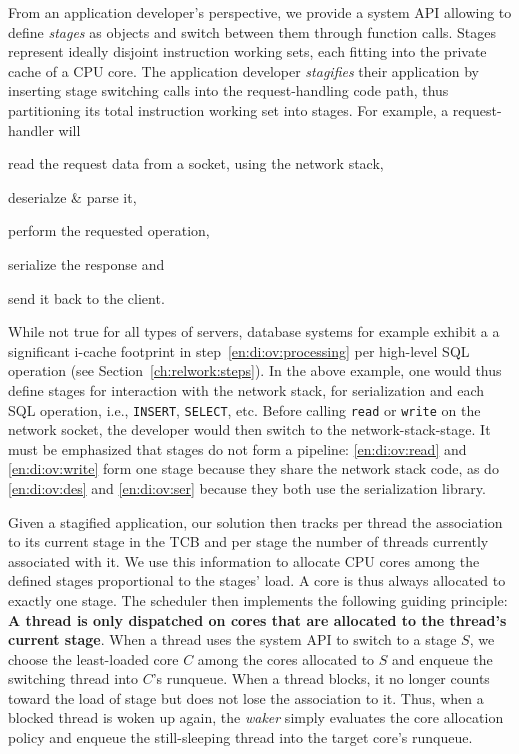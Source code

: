 \documentclass[12pt,a4paper]{book}
\begin{document}
From an application developer's perspective, we provide a system API allowing to define \emph{stages} as objects and switch between them through function calls.
Stages represent ideally disjoint instruction working sets, each fitting into the private cache of a CPU core.
The application developer \emph{stagifies} their application by inserting stage switching calls into the request-handling code path, thus partitioning its total instruction working set into stages.
For example, a request-handler will
\begin{enumerate*}[label=(\alph*)]
    \item read the request data from a socket, using the network stack, \label{en:di:ov:read}
    \item deserialze \& parse it, \label{en:di:ov:des}
    \item perform the requested operation,\label{en:di:ov:processing}
    \item serialize the response and \label{en:di:ov:ser}
    \item send it back to  the client. \label{en:di:ov:write}
\end{enumerate*}
While not true for all types of servers, database systems for example exhibit a a significant i-cache footprint in step~\ref{en:di:ov:processing} per high-level SQL operation (see Section~\ref{ch:relwork:steps}).
In the above example, one would thus define stages for interaction with the network stack, for serialization and each SQL operation, i.e., \texttt{INSERT}, \texttt{SELECT}, etc.
Before calling \texttt{read} or \texttt{write} on the network socket, the developer would then switch to the network-stack-stage.
It must be emphasized that stages do not form a pipeline: \ref{en:di:ov:read} and \ref{en:di:ov:write} form one stage because they share the network stack code, as do \ref{en:di:ov:des} and \ref{en:di:ov:ser} because they both use the serialization library.

Given a stagified application, our solution then tracks per thread the association to its current stage in the TCB and per stage the number of threads currently associated with it.
We use this information to allocate CPU cores among the defined stages proportional to the stages' load.
A core is thus always allocated to exactly one stage. %
The scheduler then implements the following guiding principle: \textbf{A thread is only dispatched on cores that are allocated to the thread's current stage}.
When a thread uses the system API to switch to a stage $S$, we choose the least-loaded core $C$ among the cores allocated to $S$ and enqueue the switching thread into $C$'s runqueue.
When a thread blocks, it no longer counts toward the load of stage but does not lose the association to it.
Thus, when a blocked thread is woken up again, the \emph{waker} simply evaluates the core allocation policy and enqueue the still-sleeping thread into the target core's runqueue.
\end{document}
